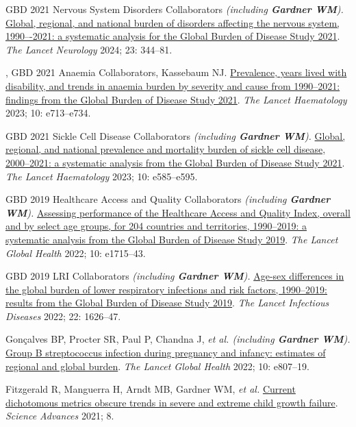 \documentclass[11pt,article,oneside]{memoir}
\begin{document}
\ind GBD 2021 Nervous System Disorders Collaborators \emph{(including \textbf{Gardner WM}).} \href{https://doi.org/10.1016/S1474-4422(24)00038-3}{Global, regional, and national burden of disorders affecting the nervous system, 
1990–-2021: a systematic analysis for the Global Burden of Disease Study 2021}. \emph{The Lancet Neurology} 2024; 23: 344--81. 

, GBD 2021 Anaemia Collaborators, Kassebaum NJ. \href{https://doi.org/10.1016/S2352-3026(23)00160-6}{Prevalence, years lived with disability, and trends in anaemia burden by severity 
and cause from 1990--2021: findings from the Global Burden of Disease Study 2021}. \emph{The Lancet Haematology} 2023; 10: e713--e734.

\ind GBD 2021 Sickle Cell Disease Collaborators \emph{(including \textbf{Gardner WM}).} \href{https://doi.org/10.1016/S2352-3026(23)00118-7}{Global, regional, and national prevalence and mortality burden of sickle cell disease, 2000--2021: 
a systematic analysis from the Global Burden of Disease Study 2021}. \emph{The Lancet Haematology} 2023; 10: e585--e595.

\ind GBD 2019 Healthcare Access and Quality Collaborators \emph{(including \textbf{Gardner WM}).} \href{https://doi.org/10.1016/S2214-109X(22)00429-6}{Assessing performance of
the Healthcare Access and Quality Index, overall and by select age groups, for 204 countries and territories,
1990--2019: a systematic analysis from the Global Burden of Disease Study 2019}. \emph{The Lancet Global Health} 2022; 10: e1715--43.

\ind GBD 2019 LRI Collaborators \emph{(including \textbf{Gardner WM}).} \href{https://doi.org/10.1016/S1473-3099(22)00510-2}{Age-sex differences in the global burden of lower
respiratory infections and risk factors, 1990--2019: results from the Global Burden of Disease Study 2019}. \emph{The Lancet Infectious Diseases} 2022; 22: 1626--47.

\ind Gonçalves BP, Procter SR, Paul P, Chandna J, \emph{et al. (including \textbf{Gardner WM}).} \href{https://doi.org/10.1016/S2214-109X(22)00093-6}{Group B streptococcus infection during pregnancy 
and infancy: estimates of regional and global burden}. \emph{The Lancet Global Health} 2022; 10: e807--19.

\ind Fitzgerald R, Manguerra H, Arndt MB, {\minbold Gardner WM}, \emph{et al.} \href{https://doi.org/10.1126/sciadv.abm8954}{Current dichotomous metrics obscure trends in
severe and extreme child growth failure}. \emph{Science Advances} 2021; 8.
\end{document}
